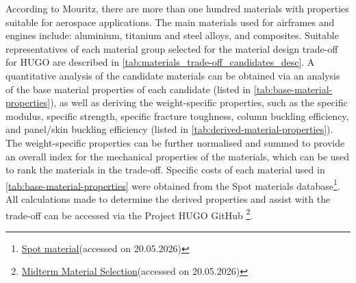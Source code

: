 According to Mouritz\cite{Mouritz2012}, there are more than one hundred materials with properties suitable for aerospace applications. The main materials used for airframes and engines include: aluminium, titanium and steel alloys, and composites. Suitable representatives of each material group selected for the material design trade-off for HUGO are described in \autoref{tab:materials_trade-off_candidates_desc}.
A quantitative analysis of the candidate materials can be obtained via an analysis of the base material properties of each candidate (listed in \autoref{tab:base-material-properties}), as well as deriving the weight-specific properties, such as the specific modulus, specific strength, specific fracture toughness, column buckling efficiency, and panel/skin buckling efficiency (listed in \autoref{tab:derived-material-properties}). The weight-specific properties can be further normalised and summed to provide an overall index for the mechanical properties of the materials, which can be used to rank the materials in the trade-off. Specific costs of each material used in \autoref{tab:base-material-properties} were obtained from the Spot materials database\footnote{\href{https://spotmaterial.com/}{Spot material}(accessed on 20.05.2026)}. All calculations made to determine the derived properties and assist with the trade-off can be accessed via the Project HUGO GitHub \footnote{\label{url:midterm_material_selection}\href{https://docs.google.com/spreadsheets/d/1GpVjdeAKDGPKHCRgVgf5LDyppZcSMRnKjkgZY_FNGBo/edit?gid=916630606#gid=916630606}{Midterm Material Selection}(accessed on 20.05.2026)}.

